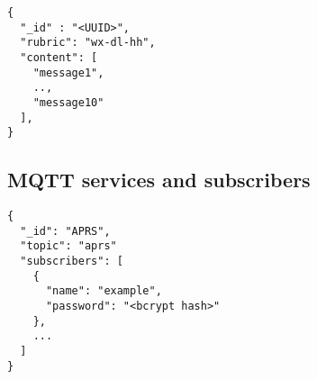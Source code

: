 \begin{lstlisting}
{
  "_id" : "<UUID>",
  "rubric": "wx-dl-hh",
  "content": [
    "message1",
    ..,
    "message10"
  ],
}
\end{lstlisting}

\subsection{MQTT services and subscribers}
\label{protocoldef:couchdb:mqttservicesandsubscribers}
\begin{lstlisting}
{
  "_id": "APRS",
  "topic": "aprs"
  "subscribers": [
    {
      "name": "example",
      "password": "<bcrypt hash>"
    },
    ...
  ]
}
\end{lstlisting}
